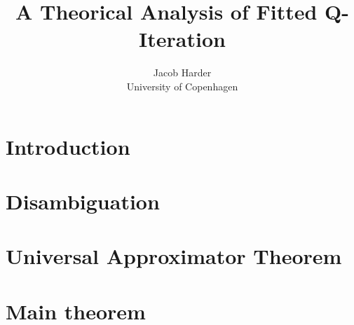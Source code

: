 \documentclass{article}
\title{A Theorical Analysis of Fitted Q-Iteration}
\author{Jacob Harder \\ University of Copenhagen}
\begin{document}
\maketitle

\section{Introduction}


\section{Disambiguation}


\section{Universal Approximator Theorem}


\section{Main theorem}

\end{document}
